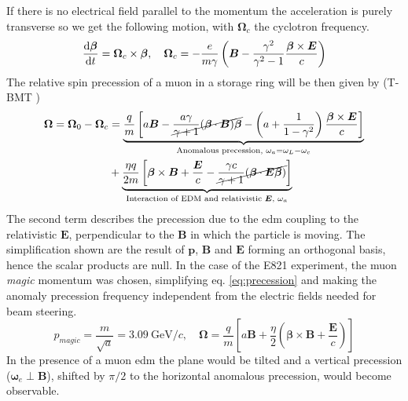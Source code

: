 \begin{refsection}
\begin{equation}
    \end{equation}
    \cite{muEDM:Flavour:2008}\cite{muEDM:Ring:2004}
    If there is no electrical field parallel to the momentum the acceleration is purely transverse so we get the following motion, with $\bm{\Omega}_c$ the cyclotron frequency.
    \begin{equation}
        \dv{\bm{\beta}}{t}=\bm{\Omega}_c\times \bm{\beta}, \quad \bm{\Omega}_c = -\frac{e}{m\gamma}\left( \bm{B}- \frac{\gamma^2}{\gamma^2-1}\frac{\bm{\beta} \times \bm{E}}{c} \right)
    \end{equation}
    The relative spin precession of a muon in a storage ring will be then given by (T-BMT \cite{miss-59})
    \begin{equation}
        \begin{split}
            \bm{\Omega}=\bm{\Omega}_0-\bm{\Omega}_c &=
            \underbrace{ 
                \frac{q}{m}\left[ a\bm{B} -\cancel{\frac{a\gamma}{\gamma+1}(\bm{\beta}\cdot \bm{B})\bm{\beta}} - \left(  a+\frac{1}{1-\gamma^2}\right)\frac{\bm{\beta} \times \bm{E}}{c} \right]
            }_{\text{Anomalous precession, } \omega_a=\omega_L-\omega_c} \\&+
            \underbrace{
                \frac{\eta q}{2m}\left[ \bm{\beta} \times \bm{B} + \frac{\bm{E}}{c}- \cancel{\frac{\gamma c}{\gamma+1}(\bm{\beta}\cdot\bm{E\beta})} \right]
            }_{\text{Interaction of EDM and relativistic $\bm{E}$, } \omega_a}
        \end{split}
        \label{eq:precession}
    \end{equation}
    The second term describes the precession due to the \gls{edm} coupling to the relativistic $\bm{E}$, perpendicular to the $\bm{B}$ in which the particle is moving. 
    The simplification shown are the result of $\bm{p}$, $\bm{B}$ and $\bm{E}$ forming an orthogonal basis, hence the scalar products are null.
    In the case of the E821 experiment, the muon \textit{magic} momentum was chosen, simplifying eq. \ref{eq:precession} and making the anomaly precession frequency independent from the electric fields needed for beam steering. 
    \begin{equation}
        p_{magic}=\frac{m}{\sqrt{a}}=3.09\ \text{GeV}/c, \quad
        \bm{\Omega} = \frac{q}{m} \left[ a\bm{B} +\frac{\eta}{2}\left( \bm{\beta}\times\bm{B} + \frac{\bm{E}}{c}\right) \right]
    \end{equation} 
    In the presence of a muon \gls{edm} the plane would be tilted and a vertical precession ($\bm{\omega}_e\perp\bm{B}$), shifted by $\pi/2$ to the horizontal anomalous precession, would become observable.


\end{refsection}
